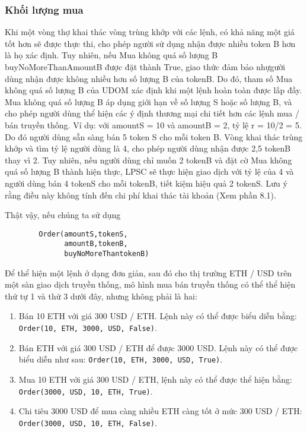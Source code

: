 \documentclass[12pt,a4paper]{article}
\begin{document}
\begin{multicols}{2}
\subsubsection{Khối lượng mua}
Khi một vòng thợ khai thác vòng trùng khớp với các lệnh, có khả năng một giá tốt hơn sẽ được thực thi, cho phép người sử dụng nhận được nhiều token B hơn là họ xác định. Tuy nhiên, nếu Mua không quá số lượng B buyNoMoreThanAmountB được đặt thành True, giao thức đảm bảo nhựgười dùng nhận được không nhiều hơn số lượng B của tokenB. Do đó, tham số Mua không quá số lượng B của UDOM xác định khi một lệnh hoàn toàn được lấp đầy. Mua không quá số lượng B áp dụng giới hạn về số lượng S hoặc số lượng B, và cho phép người dùng thể hiện các ý định thương mại chi tiết hơn các lệnh mua / bán truyền thống.
Ví dụ: với amountS = 10 và amountB = 2, tỷ lệ r = 10/2 = 5. Do đó người dùng sẵn sàng bán 5 token S cho mỗi token B. Vòng khai thác trùng khớp và tìm tỷ lệ người dùng là 4, cho phép người dùng nhận được 2,5 tokenB thay vì 2. Tuy nhiên, nếu người dùng chỉ muốn 2 tokenB và đặt cờ Mua không quá số lượng B  thành hiện thực, LPSC sẽ thực hiện giao dịch với tỷ lệ của 4 và người dùng bán 4 tokenS cho mỗi tokenB, tiết kiệm hiệu quả 2 tokenS. Lưu ý rằng điều này không tính đến chi phí khai thác tài khoản (Xem phần 8.1).

Thật vậy, nếu chúng ta sử dụng

\begin{verbatim}
        Order(amountS,tokenS,
              amountB,tokenB,
              buyNoMoreThantokenB)
\end{verbatim}
Để thể hiện một lệnh ở dạng đơn giản, sau đó cho thị trường ETH / USD trên một sàn giao dịch truyền thống, mô hình mua bán truyền thống có thể thể hiện thứ tự 1 và thứ 3 dưới đây, nhưng không phải là hai:

\begin{enumerate}
  \item Bán 10 ETH với giá 300 USD / ETH. Lệnh này có thể được biểu diễn bằng:  \verb|Order(10, ETH, 3000, USD, False)|.
  \item Bán ETH với giá 300 USD / ETH để được 3000 USD. Lệnh này có thể được biểu diễn như sau:  \verb|Order(10, ETH, 3000, USD, True)|.
  \item Mua 10 ETH với giá 300 USD / ETH, lệnh này có thể được thể hiện bằng:   \verb|Order(3000, USD, 10, ETH, True)|.
  \item Chi tiêu 3000 USD để mua càng nhiều ETH càng tốt ở mức 300 USD / ETH: \verb|Order(3000, USD, 10, ETH, False)|.
\end{enumerate}


\end{multicols}
\end{document}
